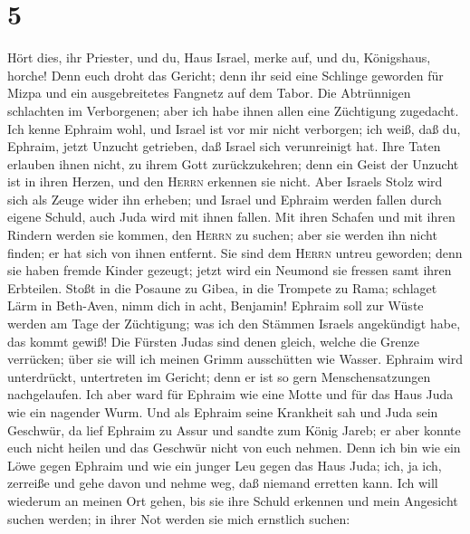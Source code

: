 \hypertarget{section-4}{%
\section{5}\label{section-4}}

 Hört dies, ihr Priester, und du, Haus Israel, merke auf,
und du, Königshaus, horche! Denn euch droht das Gericht; denn ihr seid
eine Schlinge geworden für Mizpa und ein ausgebreitetes Fangnetz auf dem
Tabor.  Die Abtrünnigen schlachten im Verborgenen; aber
ich habe ihnen allen eine Züchtigung zugedacht.  Ich kenne
Ephraim wohl, und Israel ist vor mir nicht verborgen; ich weiß, daß du,
Ephraim, jetzt Unzucht getrieben, daß Israel sich verunreinigt hat.
 Ihre Taten erlauben ihnen nicht, zu ihrem Gott
zurückzukehren; denn ein Geist der Unzucht ist in ihren Herzen, und den
\textsc{Herrn} erkennen sie nicht.  Aber Israels Stolz
wird sich als Zeuge wider ihn erheben; und Israel und Ephraim werden
fallen durch eigene Schuld, auch Juda wird mit ihnen fallen.
 Mit ihren Schafen und mit ihren Rindern werden sie
kommen, den \textsc{Herrn} zu suchen; aber sie werden ihn nicht finden;
er hat sich von ihnen entfernt.  Sie sind dem
\textsc{Herrn} untreu geworden; denn sie haben fremde Kinder gezeugt;
jetzt wird ein Neumond sie fressen samt ihren Erbteilen. 
Stoßt in die Posaune zu Gibea, in die Trompete zu Rama; schlaget Lärm in
Beth-Aven, nimm dich in acht, Benjamin!  Ephraim soll zur
Wüste werden am Tage der Züchtigung; was ich den Stämmen Israels
angekündigt habe, das kommt gewiß!  Die Fürsten Judas
sind denen gleich, welche die Grenze verrücken; über sie will ich meinen
Grimm ausschütten wie Wasser.  Ephraim wird unterdrückt,
untertreten im Gericht; denn er ist so gern Menschensatzungen
nachgelaufen.  Ich aber ward für Ephraim wie eine Motte
und für das Haus Juda wie ein nagender Wurm.  Und als
Ephraim seine Krankheit sah und Juda sein Geschwür, da lief Ephraim zu
Assur und sandte zum König Jareb; er aber konnte euch nicht heilen und
das Geschwür nicht von euch nehmen.  Denn ich bin wie ein
Löwe gegen Ephraim und wie ein junger Leu gegen das Haus Juda; ich, ja
ich, zerreiße und gehe davon und nehme weg, daß niemand erretten kann.
 Ich will wiederum an meinen Ort gehen, bis sie ihre
Schuld erkennen und mein Angesicht suchen werden; in ihrer Not werden
sie mich ernstlich suchen:


